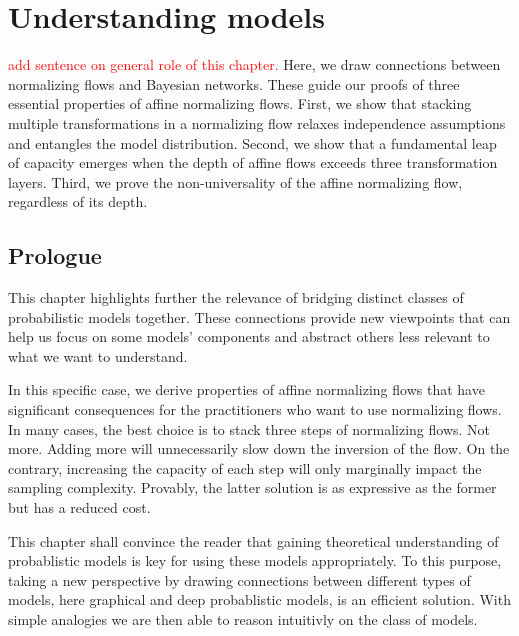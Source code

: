 \chapter{Understanding models}\label{ch:04}

\begin{chapter_outline}
  \textcolor{red}{add sentence on general role of this chapter.}
  Here, we draw connections between normalizing flows and Bayesian networks. These guide our proofs of three essential properties of affine normalizing flows.
  First, we show that stacking multiple transformations in a normalizing flow relaxes independence assumptions and entangles the model distribution.
  Second, we show that a fundamental leap of capacity emerges when the depth of affine flows exceeds three transformation layers.
  Third, we prove the non-universality of the affine normalizing flow, regardless of its depth.
\end{chapter_outline}

\section{Prologue}
This chapter highlights further the relevance of bridging distinct classes of probabilistic models together. These connections provide new viewpoints that can help us focus on some models' components and abstract others less relevant to what we want to understand.

In this specific case, we derive properties of affine normalizing flows that have significant consequences for the practitioners who want to use normalizing flows. In many cases, the best choice is to stack three steps of normalizing flows. Not more. Adding more will unnecessarily slow down the inversion of the flow. On the contrary, increasing the capacity of each step will only marginally impact the sampling complexity. Provably, the latter solution is as expressive as the former but has a reduced cost.

This chapter shall convince the reader that gaining theoretical understanding of probablistic models is key for using these models appropriately. To this purpose, taking a new perspective by drawing connections between different types of models, here graphical and deep probablistic models, is an efficient solution. With simple analogies we are then able to reason intuitivly on the class of models.

